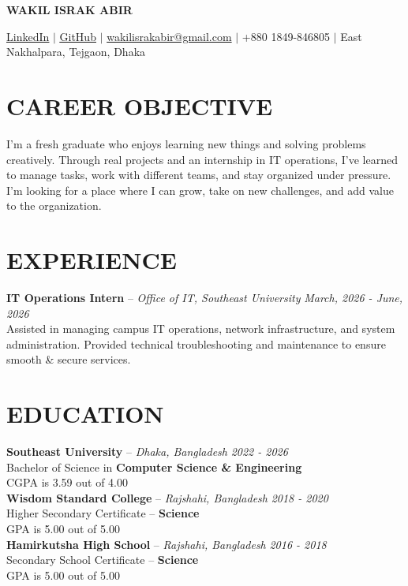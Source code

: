 \documentclass[11pt,a4paper]{article}
\begin{document}
\begin{center}
    {\fontsize{30}{36}\selectfont \textbf{WAKIL ISRAK ABIR}}
\end{center}
\vspace{0.4em}
\noindent
\href{https://www.linkedin.com/in/wakil-israk-abir/}{\uline{LinkedIn}} \hfill $|$ \hfill 
\href{https://github.com/WakilIsrakAbir}{\uline{GitHub}} \hfill $|$ \hfill 
\href{mailto:wakilisrakabir@gmail.com}{wakilisrakabir@gmail.com} \hfill $|$ \hfill 
+880 1849-846805 \hfill $|$ \hfill 
East Nakhalpara, Tejgaon, Dhaka

\vspace{0.5em}

\section*{CAREER OBJECTIVE}
I'm a fresh graduate who enjoys learning new things and solving problems creatively. Through real projects and an internship in IT operations, I've learned to manage tasks, work with different teams, and stay organized under pressure. I'm looking for a place where I can grow, take on new challenges, and add value to the organization.

\section*{EXPERIENCE}
\textbf{IT Operations Intern} -- \textit{Office of IT, Southeast University} \hfill \textit{March, 2026 - June, 2026}\\[0.2em]
Assisted in managing campus IT operations, network infrastructure, and system administration. Provided technical troubleshooting and maintenance to ensure smooth \& secure services.

\section*{EDUCATION}
\textbf{Southeast University} -- \textit{Dhaka, Bangladesh} \hfill \textit{2022 - 2026}\\
Bachelor of Science in \textbf{Computer Science \& Engineering}\\
CGPA is 3.59 out of 4.00\\[0.8em]
\textbf{Wisdom Standard College} -- \textit{Rajshahi, Bangladesh} \hfill \textit{2018 - 2020}\\
Higher Secondary Certificate -- \textbf{Science}\\
GPA is 5.00 out of 5.00\\[0.8em]
\textbf{Hamirkutsha High School} -- \textit{Rajshahi, Bangladesh} \hfill \textit{2016 - 2018}\\
Secondary School Certificate -- \textbf{Science}\\
GPA is 5.00 out of 5.00
\end{document}
